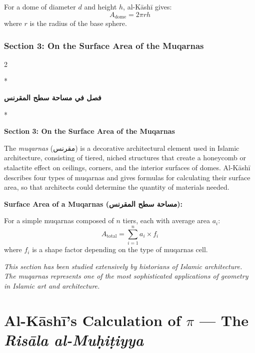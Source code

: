 \documentclass[11pt,a4paper]{article}
\newcommand{\cnote}[1]{\textcolor{notecolor}{\textit{#1}}}
\newcommand{\ar}[1]{\arabicfont\beginR #1\endR}
\newenvironment{bilingual}{%
  \vspace{0.3em}%
  \begin{paracol}{2}%
}{%
  \end{paracol}%
  \vspace{0.3em}%
}
\newenvironment{mathalgo}{%
  \par\vspace{0.3cm}
  \begin{framed}
  \setlength{\parindent}{0pt}
}{%
  \end{framed}
  \par\vspace{0.3cm}
}
\begin{document}
For a dome of diameter $d$ and height $h$, al-K\=ash\=i gives:
\[
A_{\text{dome}} = 2\pi r h
\]
where $r$ is the radius of the base sphere.

\subsubsection{Section 3: On the Surface Area of the Muqarnas}

\begin{bilingual}
\switchcolumn[0]*
\begin{center}
\textbf{\color{chapcolor}\ar{فصل في مساحة سطح المقرنس}}
\end{center}
\switchcolumn[1]*
\begin{center}
\textbf{\color{chapcolor}Section 3: On the Surface Area of the Muqarnas}
\end{center}
\end{bilingual}

The \textit{muqarnas} (\ar{مقرنس}) is a decorative architectural
element used in Islamic architecture, consisting of tiered, niched
structures that create a honeycomb or stalactite effect on ceilings,
corners, and the interior surfaces of domes. Al-K\=ash\=i describes four
types of muqarnas and gives formulas for calculating their surface area,
so that architects could determine the quantity of materials needed.

\begin{mathalgo}
\textbf{Surface Area of a Muqarnas (\ar{مساحة سطح المقرنس}):}

For a simple muqarnas composed of $n$ tiers, each with average area
$a_i$:
\[
A_{\text{total}} = \sum_{i=1}^{n} a_i \times f_i
\]
where $f_i$ is a shape factor depending on the type of muqarnas cell.
\end{mathalgo}

\cnote{This section has been studied extensively by historians of
Islamic architecture. The muqarnas represents one of the most
sophisticated applications of geometry in Islamic art and architecture.}
\clearpage

\section{Al-K\=ash\=i's Calculation of $\pi$ --- The \textit{Ris\=ala al-Mu\d{h}i\d{t}iyya}}
\label{sec:picalc}
\end{document}
